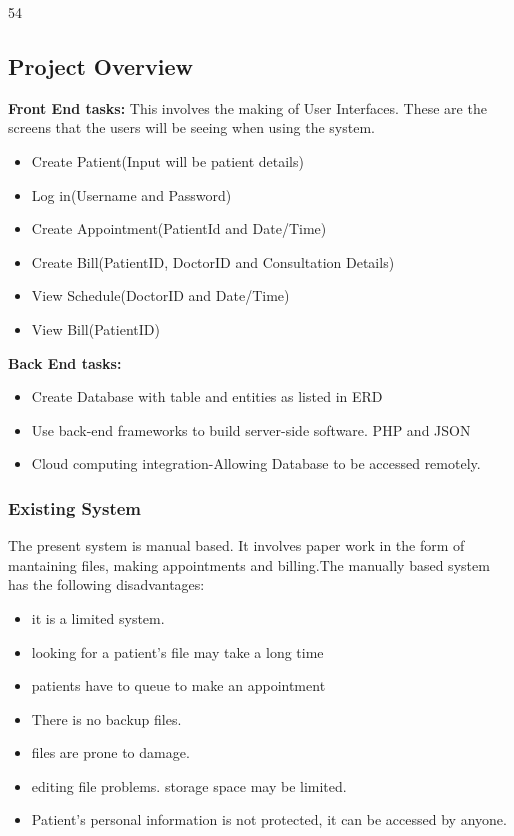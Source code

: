 \documentclass[12pt]{article}
\begin{document}
54\subsection{Project Overview}
\textbf{Front End tasks:}
    This involves the making of User Interfaces. These are the screens that the users will be seeing when using the system.
    \begin{itemize}
    \item
    Create Patient(Input will be patient details)
    \item
    Log in(Username and Password)
    \item
    Create Appointment(PatientId and Date/Time)
    \item
    Create Bill(PatientID, DoctorID and Consultation Details)
    \item
    View Schedule(DoctorID and Date/Time)
    \item
    View Bill(PatientID)
    \end{itemize}
    \textbf{Back End tasks:}
    \begin{itemize}
    \item
    Create Database with table and entities as listed in ERD
    \item
    Use back-end frameworks to build server-side software. PHP and JSON    
    \item
    Cloud computing integration-Allowing Database to be accessed remotely.
    \end{itemize}

\subsubsection{Existing System}
The present system is manual based. It involves paper work in the form of mantaining files, making appointments and billing.The manually based system has the following disadvantages:
\begin{itemize}
\item
it is a limited system.
\item
looking for a patient's file may take a long time
\item
patients have to queue to make an appointment
\item
There is no backup files.
\item
files are prone to damage.
\item
editing file problems.
storage space may be limited.
\item
Patient's personal information is not protected, it can be accessed by anyone.
\end{itemize}
\end{document}
